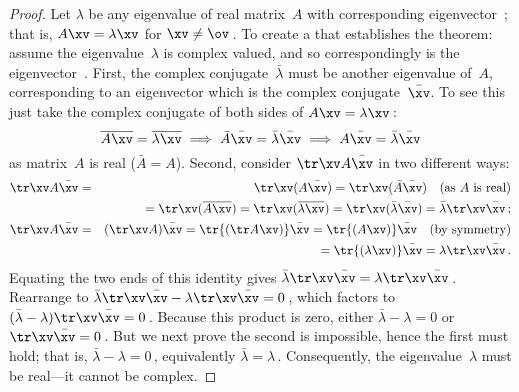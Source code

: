 \begin{proof} 
Let \(\lambda\) be any eigenvalue of real matrix~\(A\) with corresponding eigenvector~\xv; that is, \(A\xv=\lambda\xv\) for \(\xv\neq\ov\)\,.
To create a  that establishes the theorem: assume the eigenvalue~\(\lambda\) is complex valued, and so correspondingly is the eigenvector~\xv.
First,  the complex conjugate~\(\bar\lambda\) must be another eigenvalue of~\(A\), corresponding to an eigenvector which is the complex conjugate~\(\bar\xv\).
To see this just take the complex conjugate of both sides of \(A\xv=\lambda\xv\)\,:
\begin{equation*}
\overline{A\xv}=\overline{\lambda\xv}
\implies \bar A\bar\xv=\bar\lambda\bar\xv
\implies A\bar\xv=\bar\lambda\bar\xv
\end{equation*}
as matrix~\(A\) is real (\(\bar A=A\)).
Second, consider \(\tr\xv A\bar\xv\) in two different ways:
\begin{eqnarray*}
\tr\xv A\bar\xv&=&\tr\xv(A\bar\xv)
=\tr\xv(\bar A\bar\xv)\quad\text{(as \(A\) is real)}
\\&&{}=\tr\xv(\overline{ A\xv})
=\tr\xv(\overline{ \lambda\xv})
=\tr\xv(\bar\lambda\bar\xv)
=\bar\lambda\tr\xv\bar\xv\,;
\\\tr\xv A\bar\xv&=&(\tr\xv A)\bar\xv
=\tr{(\tr A\xv)}\bar\xv
=\tr{(A\xv)}\bar\xv
\quad\text{(by symmetry)}
\\&&{}=\tr{(\lambda\xv)}\bar\xv
=\lambda\tr\xv\bar\xv\,.
\end{eqnarray*}
Equating the two ends of this identity gives \(\bar\lambda\tr\xv\bar\xv=\lambda\tr\xv\bar\xv\)\,.
Rearrange to \(\bar\lambda\tr\xv\bar\xv-\lambda\tr\xv\bar\xv
=0\)\,, which factors to \((\bar\lambda-\lambda)\tr\xv\bar\xv
=0\)\,.
Because this product is zero, either \(\bar\lambda-\lambda=0\) or \(\tr\xv\bar\xv=0\)\,.
But we next prove the second is impossible, hence the first must hold; that is, \(\bar\lambda-\lambda=0\)\,, equivalently \(\bar\lambda=\lambda\)\,.
Consequently, the eigenvalue~\(\lambda\) must be real---it cannot be complex.


\end{proof}

